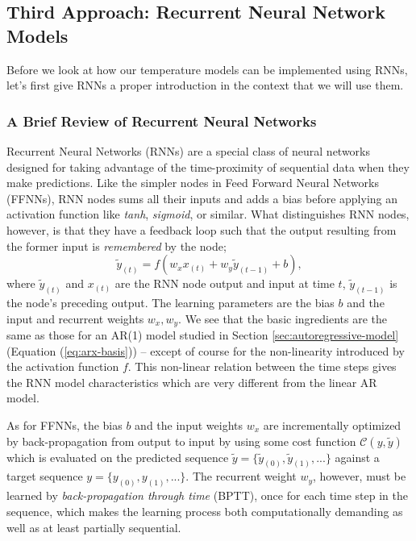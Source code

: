 \documentclass[]{article}
\begin{document}
\subsection{Third Approach: Recurrent Neural Network Models} \label{sec:neural-model}
Before we look at how our temperature models can be implemented using RNNs, let's first give RNNs a proper introduction in the context that we will use them.

\subsubsection{A Brief Review of Recurrent Neural Networks} \label{sec:rnn-review}
Recurrent Neural Networks (RNNs) are a special class of neural networks designed for taking advantage of the time-proximity of sequential data when they make predictions. Like the simpler nodes in Feed Forward Neural Networks (FFNNs), RNN nodes sums all their inputs and adds a bias before applying an activation function like \textit{tanh}, \textit{sigmoid}, or similar. What distinguishes RNN nodes, however, is that they have a feedback loop such that the output resulting from the former input is \textit{remembered} by the node;
\begin{equation} \label{eq:rnn-node}
	\tilde{y}_{(t)} = f(w_x x_{(t)} + w_y \tilde{y}_{(t-1)} + b),
\end{equation} 
where $\tilde{y}_{(t)}$ and $x_{(t)}$ are the RNN node output and input at time $t$, $\tilde{y}_{(t-1)}$ is the node's preceding output. The learning parameters are the bias $b$ and the input and recurrent weights $w_x, w_y$. We see that the basic ingredients are the same as those for an AR(1) model studied in Section \ref{sec:autoregressive-model} (Equation (\ref{eq:arx-basis})) -- except of course for the non-linearity introduced by the activation function $f$. This non-linear relation between the time steps gives the RNN model characteristics which are very different from the linear AR model.

As for FFNNs, the bias $b$ and the input weights $w_x$ are incrementally optimized by back-propagation from output to input by using some cost function $\mathcal{C}(y, \tilde{y})$ which is evaluated on the predicted sequence $\tilde{y} = \{\tilde{y}_{(0)}, \tilde{y}_{(1)}, ...\}$ against a target sequence $y = \{y_{(0)}, y_{(1)}, ...\}$. The recurrent weight $w_y$, however, must be learned by \textit{back-propagation through time} (BPTT), once for each time step in the sequence, which makes the learning process both computationally demanding as well as at least partially sequential.
\end{document}
